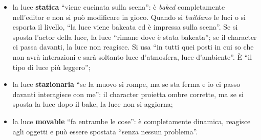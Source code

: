 \begin{itemize}
  \item la luce \textbf{statica} ``viene cucinata sulla scena'': è \emph{baked}
        completamente nell'editor e non si può modificare in gioco. Quando si
        \emph{buildano} le luci o si esporta il livello, ``la luce viene bakeata ed è
        impressa sulla scena''. Se si sposta l'actor della luce, la luce ``rimane dove è
        stata bakeata''; se il character ci passa davanti, la luce non reagisce. Si usa ``in
        tutti quei posti in cui so che non avrà interazioni e sarà soltanto luce
        d'atmosfera, luce d'ambiente''. È ``il tipo di luce più leggero'';
  \item la luce \textbf{stazionaria} ``se la muovo si rompe, ma se sta ferma e io ci passo
        davanti interagisce con me'': il character proietta ombre corrette, ma se si sposta
        la luce dopo il bake, la luce non si aggiorna;
  \item la luce \textbf{movable} ``fa entrambe le cose'': è completamente dinamica, reagisce
        agli oggetti e può essere spostata ``senza nessun problema''.
\end{itemize}

